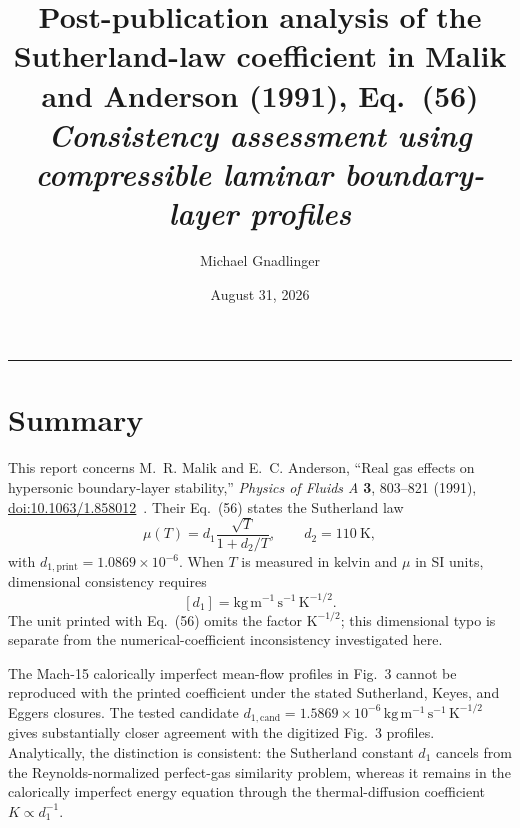 \documentclass[11pt]{article}
\title{\vspace{-3em}\textcolor{HypBlue}{Post-publication analysis of the Sutherland-law coefficient in Malik and Anderson (1991), Eq.~(56)}\\[1.2em]\large \textit{Consistency assessment using compressible laminar boundary-layer profiles}\vspace{-1em}}
\author{Michael Gnadlinger}
\date{August 31, 2026}
\begin{document}
\maketitle
\vspace{-1em}
\hrule
\vspace{-1em}

\section{Summary}
\label{sec:short_conclusion}
This report concerns M.~R. Malik and E.~C. Anderson, ``Real gas effects on hypersonic boundary-layer stability,'' \emph{Physics of Fluids A} \textbf{3}, 803--821 (1991), \href{https://doi.org/10.1063/1.858012}{doi:10.1063/1.858012}~\cite{malik1991}. Their Eq.~(56) states the Sutherland law
\[
  \mu(T)=d_1\frac{\sqrt{T}}{1+d_2/T},
  \qquad d_2=110~\mathrm{K},
\]
with \(d_{1,\mathrm{print}}=1.0869\times10^{-6}\). When \(T\) is measured in kelvin and \(\mu\) in SI units, dimensional consistency requires
\[
  [d_1]=\mathrm{kg\,m^{-1}\,s^{-1}\,K^{-1/2}}.
\]
The unit printed with Eq.~(56) omits the factor \(\mathrm{K^{-1/2}}\); this dimensional typo is separate from the numerical-coefficient inconsistency investigated here.

The Mach-15 calorically imperfect mean-flow profiles in Fig.~3 cannot be reproduced with the printed coefficient under the stated Sutherland, Keyes, and Eggers closures. The tested candidate \(d_{1,\mathrm{cand}}=1.5869\times10^{-6}\,\mathrm{kg\,m^{-1}\,s^{-1}\,K^{-1/2}}\) gives substantially closer agreement with the digitized Fig.~3 profiles. Analytically, the distinction is consistent: the Sutherland constant \(d_1\) cancels from the Reynolds-normalized perfect-gas similarity problem, whereas it remains in the calorically imperfect energy equation through the thermal-diffusion coefficient \(K\propto d_1^{-1}\).
\end{document}

